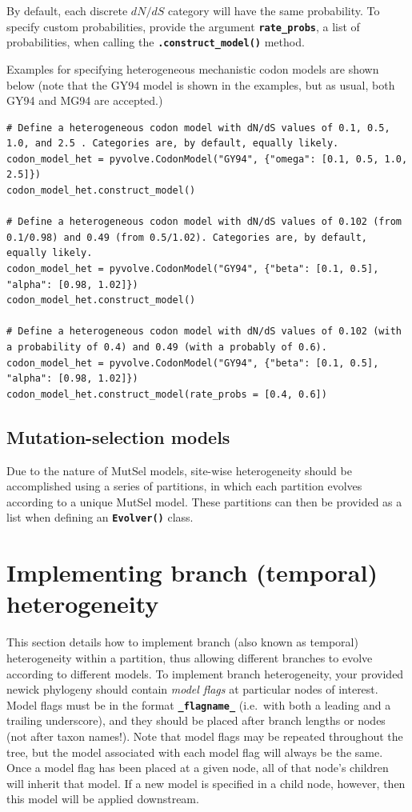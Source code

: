\documentclass{article}
\newcommand{\code}[1]{\textbf{\texttt{\small{#1}}}}
\begin{document}
By default, each discrete $dN/dS$ category will have the same probability. To specify custom probabilities, provide the argument \code{rate\_probs}, a list of probabilities, when calling the \code{.construct\_model()} method.

Examples for specifying heterogeneous mechanistic codon models are shown below (note that the GY94 model is shown in the examples, but as usual, both GY94 and MG94 are accepted.)
\begin{lstlisting}
# Define a heterogeneous codon model with dN/dS values of 0.1, 0.5, 1.0, and 2.5 . Categories are, by default, equally likely.
codon_model_het = pyvolve.CodonModel("GY94", {"omega": [0.1, 0.5, 1.0, 2.5]})
codon_model_het.construct_model()

# Define a heterogeneous codon model with dN/dS values of 0.102 (from 0.1/0.98) and 0.49 (from 0.5/1.02). Categories are, by default, equally likely.
codon_model_het = pyvolve.CodonModel("GY94", {"beta": [0.1, 0.5], "alpha": [0.98, 1.02]})
codon_model_het.construct_model()

# Define a heterogeneous codon model with dN/dS values of 0.102 (with a probability of 0.4) and 0.49 (with a probably of 0.6).
codon_model_het = pyvolve.CodonModel("GY94", {"beta": [0.1, 0.5], "alpha": [0.98, 1.02]})
codon_model_het.construct_model(rate_probs = [0.4, 0.6])
\end{lstlisting}


\subsection{Mutation-selection models}

Due to the nature of MutSel models, site-wise heterogeneity should be accomplished using a series of partitions, in which each partition evolves according to a unique MutSel model. These partitions can then be provided as a list when defining an \code{Evolver()} class.


\section{Implementing branch (temporal) heterogeneity}\label{sec:branchhet}

This section details how to implement branch (also known as temporal) heterogeneity within a partition, thus allowing different branches to evolve according to different models. To implement branch heterogeneity, your provided newick phylogeny should contain \emph{model flags} at particular nodes of interest. Model flags must be in the format \code{\_flagname\_} (i.e.\ with both a leading and a trailing underscore), and they should be placed after branch lengths or nodes (not after taxon names!). Note that model flags may be repeated throughout the tree, but the model associated with each model flag will always be the same. Once a model flag has been placed at a given node, all of that node's children will inherit that model. If a new model is specified in a child node, however, then this model will be applied downstream.
\end{document}

